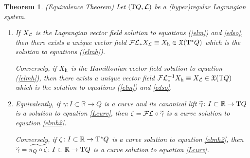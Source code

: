 \documentclass[12pt]{report}
\newtheorem{teor}{Theorem}[chapter]
\def\ben{\begin{enumerate}}
\def\een{\end{enumerate}}
\def\vf{\mathfrak X}
\def\Lag{{\cal L}}
\def\Real{\mathbb{R}}
\def\Tan{{\rm T}}
\def\Leg{{\cal F}\Lag}
\begin{document}
\begin{teor} {\rm (Equivalence Theorem)}
\label{eqteorema}
Let $(\Tan Q,\Lag)$ be a (hyper)regular Lagrangian system.
\ben
\item
If $X_\Lag$ is the Lagrangian vector field 
solution to equations (\ref{elm}) and \eqref{edso},
then there exists a unique vector field
 $\Leg_*X_\Lag\equiv X_{\rm h}\in\vf (\Tan^*Q)$
which is the solution to equations (\ref{elmh}).

Conversely, if $X_{\rm h}$ is the Hamiltonian vector field
solution to equation (\ref{elmh}),
then there exists a unique vector field
 $\Leg_*^{-1}X_{\rm h}\equiv X_\Lag\in\vf (\Tan Q)$
which is the solution to equations (\ref{elm}) and \eqref{edso}.
\item
Equivalently, if $\gamma \colon I\subset\Real\to Q$ 
is a curve and its canonical lift
$\widetilde \gamma \colon I\subset\Real\to \Tan Q$ is a
solution to equation \eqref{Lcurv},
then $\zeta=\Leg\circ\widetilde \gamma$ is a curve
solution to equation \eqref{elmh2}.

Conversely, if $\zeta \colon I\subset\Real\to \Tan^*Q$ 
is a curve solution to equation \eqref{elmh2},
then $\widetilde\gamma=\widetilde{\pi_Q\circ\zeta} \colon I\subset\Real\to \Tan Q$ 
is a curve solution to equation \eqref{Lcurv}.
\een
\end{teor}
\end{document}
